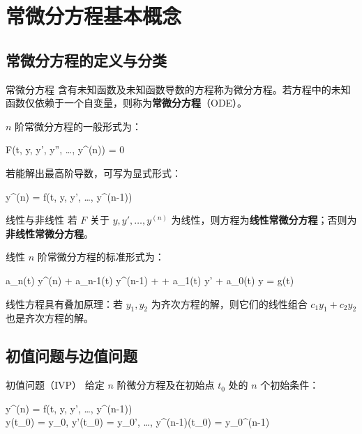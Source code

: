 \section{常微分方程基本概念}

\subsection{常微分方程的定义与分类}

\begin{mydefinition}{常微分方程}
	含有未知函数及未知函数导数的方程称为微分方程。若方程中的未知函数仅依赖于一个自变量，则称为\textbf{常微分方程}（ODE）。
\end{mydefinition}

$n$ 阶常微分方程的一般形式为：
\begin{myformula}
	F\left(t, y, y', y'', \ldots, y^{(n)}\right) = 0
\end{myformula}

若能解出最高阶导数，可写为显式形式：
\begin{myformula}
	y^{(n)} = f\left(t, y, y', \ldots, y^{(n-1)}\right)
\end{myformula}

\begin{mydefinition}{线性与非线性}
	若 $F$ 关于 $y, y', \ldots, y^{(n)}$ 为线性，则方程为\textbf{线性常微分方程}；否则为\textbf{非线性常微分方程}。
\end{mydefinition}

线性 $n$ 阶常微分方程的标准形式为：
\begin{myformula}
	a_n(t) y^{(n)} + a_{n-1}(t) y^{(n-1)} + \cdots + a_1(t) y' + a_0(t) y = g(t)
\end{myformula}

\begin{remark}
	线性方程具有叠加原理：若 $y_1, y_2$ 为齐次方程的解，则它们的线性组合 $c_1 y_1 + c_2 y_2$ 也是齐次方程的解。
\end{remark}

\subsection{初值问题与边值问题}

\begin{mydefinition}{初值问题（IVP）}
	给定 $n$ 阶微分方程及在初始点 $t_0$ 处的 $n$ 个初始条件：
	\begin{myformula}
		\begin{cases}
			y^{(n)} = f(t, y, y', \ldots, y^{(n-1)}) \\[4pt]
			y(t_0) = y_0, \; y'(t_0) = y_0', \; \ldots, \; y^{(n-1)}(t_0) = y_0^{(n-1)}
		\end{cases}
	\end{myformula}
\end{mydefinition}

